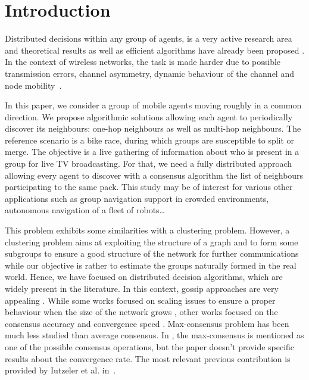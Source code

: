 \documentclass{sig-alternate}
\begin{document}


\section{Introduction}
Distributed decisions within any group of agents, is a very active research area and theoretical results as well as efficient algorithms have already been proposed \cite{Boyd,Gossip,Gossip2}.
In the context of wireless networks, the task is made harder due to possible transmission errors, channel asymmetry, dynamic behaviour of the channel and node mobility~\cite{kar2009distributed,marechal2010joint}.

In this paper, we consider a group of mobile agents moving roughly in a common direction. We propose algorithmic solutions allowing each agent to periodically discover its neighbours: one-hop neighbours  as well as multi-hop neighbours.
The reference scenario is a bike race, during which groups are susceptible to split or merge. The objective is a live gathering of information about who is present in a group for live TV broadcasting. For that, we need a fully distributed approach allowing every agent to discover with a consensus algorithm  the list of neighbours participating to the same pack.
This study may be of interest for various other applications such as group navigation support in crowded environments, autonomous navigation of a fleet of robots\ldots

This problem exhibits some similarities with a clustering problem. However, a clustering problem aims at exploiting the structure of a graph and to form some subgroups to ensure a good structure of the network for further communications while our objective is rather to estimate the groups naturally formed in the real world.
Hence, we have  focused on distributed decision algorithms, which are widely present in the literature. In this context, gossip approaches are very appealing \cite{Cortes2008,Boyd,Gossip,Gossip2}.
While some works focused on scaling issues to ensure a proper behaviour when the size of the network grows \cite{kermarrec2003probabilistic}, other works focused on the consensus accuracy and convergence speed \cite{Boyd,Gossip}.
Max-consensus problem has been much less studied than average consensus. In \cite{Cortes2008}, the max-consensus is mentioned as one of the possible consensus operations, but the paper doesn't provide specific results about the convergence rate. The most relevant previous contribution is provided by Iutzeler et al. in~\cite{Iutzeler2012}.
\end{document}
